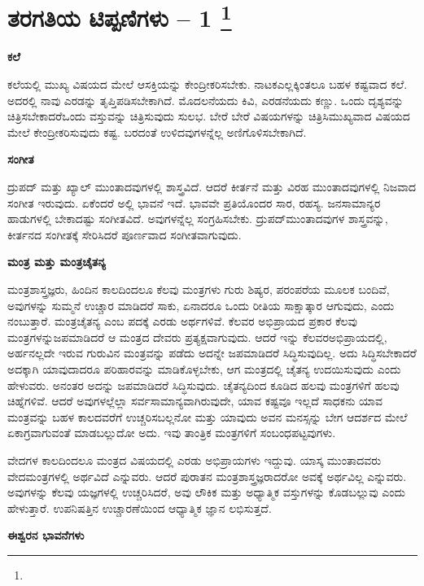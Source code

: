 
\chapter[ತರಗತಿಯ ಟಿಪ್ಪಣಿಗಳು – 1 ]{ತರಗತಿಯ ಟಿಪ್ಪಣಿಗಳು – 1 \protect\footnote{}}

\centerline{\textbf{ಕಲೆ}}

ಕಲೆಯಲ್ಲಿ ಮುಖ್ಯ ವಿಷಯದ ಮೇಲೆ ಆಸಕ್ತಿಯನ್ನು ಕೇಂದ್ರೀಕರಿಸಬೇಕು. ನಾಟಕ\break ಎಲ್ಲಕ್ಕಿಂತಲೂ ಬಹಳ ಕಷ್ಟವಾದ ಕಲೆ. ಅದರಲ್ಲಿ ನಾವು ಎರಡನ್ನು ತೃಪ್ತಿಪಡಿಸಬೇಕಾಗಿದೆ. ಮೊದಲನೆಯದು ಕಿವಿ, ಎರಡನೆಯದು ಕಣ್ಣು. ಒಂದು ದೃಶ್ಯವನ್ನು ಚಿತ್ರಿಸಬೇಕಾದರೆ\break ಒಂದು ವಸ್ತುವನ್ನು ಚಿತ್ರಿಸುವುದು ಸುಲಭ. ಬೇರೆ ಬೇರೆ ವಿಷಯಗಳನ್ನು ಚಿತ್ರಿಸಿ\break ಮುಖ್ಯವಾದ ವಿಷಯದ ಮೇಲೆ ಕೇಂದ್ರೀಕರಿಸುವುದು ಕಷ್ಟ. ಬರದಂತೆ ಉಳಿದವುಗಳನ್ನೆಲ್ಲ ಅಣಿಗೊಳಿಸಬೇಕಾಗಿದೆ.

\centerline{\textbf{ಸಂಗೀತ}}

ದ್ರುಪದ್​ ಮತ್ತು ಖ್ಯಾಲ್​ ಮುಂತಾದವುಗಳಲ್ಲಿ ಶಾಸ್ತ್ರವಿದೆ. ಆದರೆ ಕೀರ್ತನೆ ಮತ್ತು ವಿರಹ ಮುಂತಾದವುಗಳಲ್ಲಿ ನಿಜವಾದ ಸಂಗೀತ ಇರುವುದು. ಏಕೆಂದರೆ ಅಲ್ಲಿ ಭಾವನೆ ಇದೆ. ಭಾವವೇ ಪ್ರತಿಯೊಂದರ ಸಾರ, ರಹಸ್ಯ. ಜನಸಾಮಾನ್ಯರ ಹಾಡುಗಳಲ್ಲಿ ಬೇಕಾದಷ್ಟು ಸಂಗೀತವಿದೆ. ಅವುಗಳನ್ನೆಲ್ಲ ಸಂಗ್ರಹಿಸಬೇಕು. ದ್ರುಪದ್​ ಮುಂತಾದವುಗಳ ಶಾಸ್ತ್ರವನ್ನು, ಕೀರ್ತನದ ಸಂಗೀತಕ್ಕೆ ಸೇರಿಸಿದರೆ ಪೂರ್ಣವಾದ ಸಂಗೀತವಾಗುವುದು.

\centerline{\textbf{ಮಂತ್ರ ಮತ್ತು ಮಂತ್ರಚೈತನ್ಯ}}

ಮಂತ್ರಶಾಸ್ತ್ರಜ್ಞರು, ಹಿಂದಿನ ಕಾಲದಿಂದಲೂ ಕೆಲವು ಮಂತ್ರಗಳು ಗುರು ಶಿಷ್ಯರ, ಪರಂಪರೆಯ ಮೂಲಕ ಬಂದಿವೆ, ಅವುಗಳನ್ನು ಸುಮ್ಮನೆ ಉಚ್ಚಾರ ಮಾಡಿದರೆ ಸಾಕು, ಏನಾದರೂ ಒಂದು ರೀತಿಯ ಸಾಕ್ಷಾತ್ಕಾರ ಆಗುವುದು, ಎಂದು ನಂಬುತ್ತಾರೆ. ಮಂತ್ರಚೈತನ್ಯ ಎಂಬ ಪದಕ್ಕೆ ಎರಡು ಅರ್ಥಗಳಿವೆ. ಕೆಲವರ ಅಭಿಪ್ರಾಯದ ಪ್ರಕಾರ ಕೆಲವು ಮಂತ್ರಗಳನ್ನು\break ಜಪಮಾಡಿದರೆ ಆ ಮಂತ್ರದ ದೇವರು ಪ್ರತ್ಯಕ್ಷವಾಗುವುದು. ಆದರೆ ಇನ್ನು ಕೆಲವರ\break ಅಭಿಪ್ರಾಯದಲ್ಲಿ, ಅರ್ಹನಲ್ಲದೇ ಇರುವ ಗುರುವಿನ ಮಂತ್ರವನ್ನು ಪಡೆದು ಅದನ್ನೇ ಜಪಮಾಡಿದರೆ ಸಿದ್ಧಿಸುವುದಿಲ್ಲ. ಅದು ಸಿದ್ಧಿಸಬೇಕಾದರೆ ಅದಕ್ಕಾಗಿ ಯಾವುದಾದರೂ ಪರಿಹಾರವನ್ನು ಮಾಡಿಕೊಳ್ಳಬೇಕು, ಆಗ ಮಂತ್ರದಲ್ಲಿ ಚೈತನ್ಯ ಉದಯಿಸುವುದು ಎಂದು ಹೇಳುವರು. ಅನಂತರ ಅದನ್ನು ಜಪಮಾಡಿದರೆ ಸಿದ್ಧಿಸುವುದು. ಚೈತನ್ಯದಿಂದ ಕೂಡಿದ ಹಲವು ಮಂತ್ರಗಳಿಗೆ ಹಲವು ಚಿಹ್ನೆಗಳಿವೆ. ಆದರೆ ಅವುಗಳಲ್ಲೆಲ್ಲಾ ಸರ್ವಸಾಮಾನ್ಯವಾಗಿರುವುದೇ, ಯಾವ ಕಷ್ಟವೂ ಇಲ್ಲದೆ ಸಾಧಕನು ಯಾವ ಮಂತ್ರವನ್ನು ಬಹಳ ಕಾಲದವರೆಗೆ ಉಚ್ಚರಿಸಬಲ್ಲನೋ ಮತ್ತು ಯಾವುದು ಅವನ ಮನಸ್ಸನ್ನು ಬೇಗ ಆದರ್ಶದ ಮೇಲೆ ಏಕಾಗ್ರವಾಗುವಂತೆ ಮಾಡಬಲ್ಲುದೋ ಅದು. ಇವು ತಾಂತ್ರಿಕ ಮಂತ್ರಗಳಿಗೆ ಸಂಬಂಧಪಟ್ಟವುಗಳು.

ವೇದಗಳ ಕಾಲದಿಂದಲೂ ಮಂತ್ರದ ವಿಷಯದಲ್ಲಿ ಎರಡು ಅಭಿಪ್ರಾಯಗಳು ಇದ್ದುವು. ಯಾಸ್ಕ ಮುಂತಾದವರು ವೇದಮಂತ್ರಗಳಲ್ಲಿ ಅರ್ಥವಿದೆ ಎನ್ನುವರು. ಆದರೆ ಪುರಾತನ ಮಂತ್ರಶಾಸ್ತ್ರಜ್ಞರಾದರೋ ಅವಕ್ಕೆ ಅರ್ಥವಿಲ್ಲ ಎನ್ನುವರು. ಅವುಗಳನ್ನು ಕೆಲವು ಯಜ್ಞಗಳಲ್ಲಿ ಉಚ್ಚರಿಸಿದರೆ, ಅವು ಲೌಕಿಕ ಮತ್ತು ಅಧ್ಯಾತ್ಮಿಕ ವಸ್ತುಗಳನ್ನು ಕೊಡಬಲ್ಲುವು ಎಂದು ಹೇಳುತ್ತಾರೆ. ಉಪನಿಷತ್ತಿನ ಉಚ್ಚಾರಣೆಯಿಂದ ಆಧ್ಯಾತ್ಮಿಕ ಜ್ಞಾನ ಲಭಿಸುತ್ತದೆ.

\centerline{\textbf{ಈಶ್ವರನ ಭಾವನೆಗಳು}}

